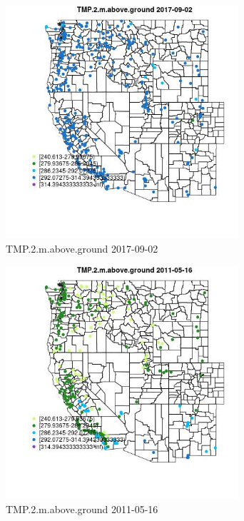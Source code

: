 \begin{figure} 
\centering  
\includegraphics[width=0.77\textwidth]{Code_Outputs/Report_ML_input_PM25_Step4_part_e_de_duplicated_aves_compiled_2019-05-20wNAs_MapObsTMP2maboveground2017-09-02.jpg} 
\caption{\label{fig:Report_ML_input_PM25_Step4_part_e_de_duplicated_aves_compiled_2019-05-20wNAsMapObsTMP2maboveground2017-09-02}TMP.2.m.above.ground 2017-09-02} 
\end{figure} 
 

\begin{figure} 
\centering  
\includegraphics[width=0.77\textwidth]{Code_Outputs/Report_ML_input_PM25_Step4_part_e_de_duplicated_aves_compiled_2019-05-20wNAs_MapObsTMP2maboveground2011-05-16.jpg} 
\caption{\label{fig:Report_ML_input_PM25_Step4_part_e_de_duplicated_aves_compiled_2019-05-20wNAsMapObsTMP2maboveground2011-05-16}TMP.2.m.above.ground 2011-05-16} 
\end{figure} 
 

